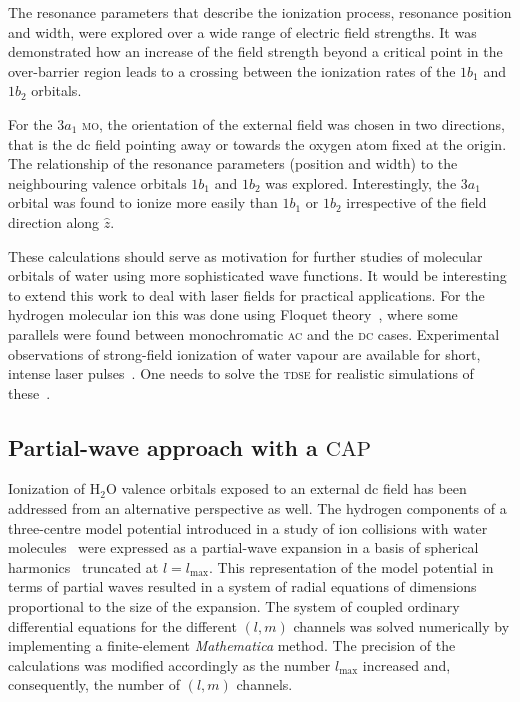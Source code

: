 The resonance parameters that describe the ionization process,
resonance position and width, were explored over a wide range of
electric field strengths. It was demonstrated how an increase of the
field strength beyond a critical point in the over-barrier region
leads to a crossing between the ionization rates of the $1b_{1}$ and
$1b_{2}$ orbitals.

For the $3a_{1}$ \textsc{mo}, the orientation of the external field
was chosen in two directions, that is the dc field pointing away or
towards the oxygen atom fixed at the origin. The relationship of the
resonance parameters (position and width) to the neighbouring valence
orbitals $1b_{1}$ and $1b_{2}$ was explored. Interestingly, the
$3a_{1}$ orbital was found to ionize more easily than $1b_{1}$ or
$1b_{2}$ irrespective of the field direction along $\hat{z}$.

These calculations should serve as motivation for further studies of
molecular orbitals of water using more sophisticated wave
functions. It would be interesting to extend this work to deal with
laser fields for practical applications. For the hydrogen molecular
ion this was done using Floquet theory~\cite{Tsog_H2mol_ac_2013},
where some parallels were found between monochromatic \textsc{ac} and
the \textsc{dc} cases. Experimental observations of strong-field
ionization of water vapour are available for short, intense laser
pulses~\cite{exp_h2o_laser_2008,exp_h2o_laser_2014}. One needs to
solve the \textsc{tdse} for realistic simulations of
these~\cite{Farrell_2011,Falge_2010}.


\subsection*{Partial-wave approach with a $\mathrm{CAP}$}

Ionization of H$_{2}$O valence orbitals exposed to an external dc
field has been addressed from an alternative perspective as well. The
hydrogen components of a three-centre model potential introduced in a
study of ion collisions with water
molecules~\cite{illescas_modelV_2011} were expressed as a partial-wave
expansion in a basis of spherical harmonics~\cite{marko_partialwave}
truncated at $l = l_{\mathrm{max}}$. This representation of the model
potential in terms of partial waves resulted in a system of radial
equations of dimensions proportional to the size of the expansion. The
system of coupled ordinary differential equations for the different
$(l,m)$ channels was solved numerically by implementing a
finite-element \emph{Mathematica} method. The precision of the
calculations was modified accordingly as the number $l_{\mathrm{max}}$
increased and, consequently, the number of $(l,m)$ channels.

